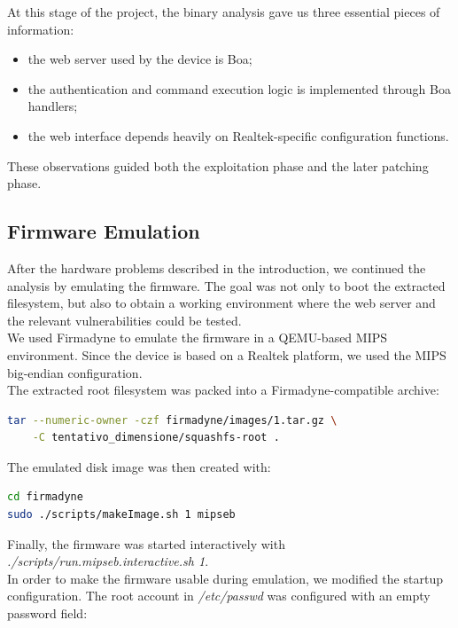               At this stage of the project, the binary analysis gave us three essential pieces of information:
              \begin{itemize}
                  \item the web server used by the device is Boa;
                  \item the authentication and command execution logic is implemented through Boa handlers;
                  \item the web interface depends heavily on Realtek-specific configuration functions.
              \end{itemize}

              These observations guided both the exploitation phase and the later patching phase.

          \subsection{Firmware Emulation}
              \label{sec:firmware emulation}

              After the hardware problems described in the introduction, we continued the analysis by emulating the firmware. The goal was not only to boot the extracted filesystem, but also to obtain a working
              environment where the web server and the relevant vulnerabilities could be tested.
              \\
              We used Firmadyne to emulate the firmware in a QEMU-based MIPS environment. Since the device is based on a Realtek platform, we used the MIPS big-endian configuration.
              \\
              The extracted root filesystem was packed into a Firmadyne-compatible archive:

\begin{lstlisting}[language=bash]
tar --numeric-owner -czf firmadyne/images/1.tar.gz \
    -C tentativo_dimensione/squashfs-root .
\end{lstlisting}

              The emulated disk image was then created with:

\begin{lstlisting}[language=bash]
cd firmadyne
sudo ./scripts/makeImage.sh 1 mipseb
\end{lstlisting}

              Finally, the firmware was started interactively with \emph{./scripts/run.mipseb.interactive.sh 1}.
              \\
              In order to make the firmware usable during emulation, we modified the startup configuration. The root account in \emph{/etc/passwd} was configured with an empty password field:

